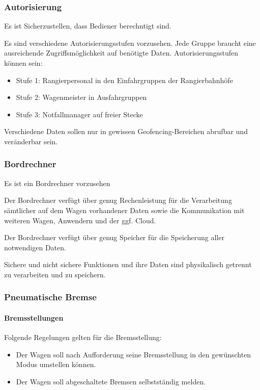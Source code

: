 \subsubsection{Autorisierung}
\begin{feat}
Es ist Sicherzustellen, dass Bediener berechntigt sind.
\end{feat}
\begin{rem} [zu Anf. 40]
Es sind verschiedene Autorisierungsstufen vorzusehen. Jede Gruppe braucht eine ausreichende Zugriffsmöglichkeit auf benötigte Daten.
Autorisierungsstufen können sein:
\begin{itemize}
    \item Stufe 1: Rangierpersonal in den Einfahrgruppen der Rangierbahnhöfe
    \item Stufe 2: Wagenmeister in Ausfahrgruppen
    \item Stufe 3: Notfallmanager auf freier Stecke
\end{itemize}
\end{rem}
\begin{rem} [zu Anf. 40]
Verschiedene Daten sollen nur in gewissen Geofencing-Bereichen abrufbar und veränderbar sein.
\end{rem}

\subsubsection{Bordrechner}
\begin{feat}
Es ist ein Bordrechner vorzusehen
\end{feat}
\begin{feat}
Der Bordrechner verfügt über genug Rechenleistung für die Verarbeitung sämtlicher auf dem Wagen vorhandener Daten sowie die Kommunikation mit weiteren Wagen, Anwendern und der ggf. Cloud.
\end{feat}
\begin{feat}
Der Bordrechner verfügt über genug Speicher für die Speicherung aller notwendigen Daten.
\end{feat}
\begin{feat}
Sichere und nicht sichere Funktionen und ihre Daten sind physikalisch getrennt zu verarbeiten und zu speichern.
\end{feat}

\subsubsection{Pneumatische Bremse}
\paragraph{Bremsstellungen}
\begin{feat}
Folgende Regelungen gelten für die Bremsstellung:
\begin{itemize}
    \item Der Wagen soll nach Aufforderung seine Bremsstellung in den gewünschten Modus umstellen können.
    \item Der Wagen soll abgeschaltete Bremsen selbstständig melden.
\end{itemize}
\end{feat}

